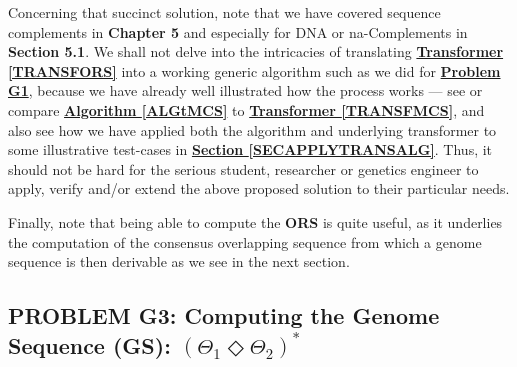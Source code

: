 \documentclass[a4paper, 18pt]{article} %
\begin{document}
Concerning that succinct solution, note that we have covered sequence complements in \textbf{Chapter 5}\cite{lutalo_2025_trans_genetics} and especially for DNA or na-Complements in \textbf{Section 5.1}. We shall not delve into the intricacies of translating \textbf{\hyperref[TRANSFORS]{Transformer \ref{TRANSFORS}}} into a working generic algorithm such as we did for \textbf{\hyperref[PROBG1]{Problem G1}}, because we have already well illustrated how the process works --- see or compare  \textbf{\hyperref[ALGtMCS]{Algorithm \ref{ALGtMCS}}} to \textbf{\hyperref[TRANSFMCS]{Transformer \ref{TRANSFMCS}}}, and also see how we have applied both the algorithm and underlying transformer to some illustrative test-cases in \textbf{\hyperref[SECAPPLYTRANSALG]{Section \ref{SECAPPLYTRANSALG}}}. Thus, it should not be hard for the serious student, researcher or genetics engineer to apply, verify and/or extend the above proposed solution to their particular needs.

Finally, note that being able to compute the \textbf{ORS} is quite useful, as it underlies the computation of the consensus overlapping sequence from which a genome sequence is then derivable as we see in the next section.



\subsection{PROBLEM G3: Computing the Genome Sequence (GS): $(\Theta_1 \Diamond \Theta_2)^*$}
\label{SECCOMPGENSEQ}
\end{document}
